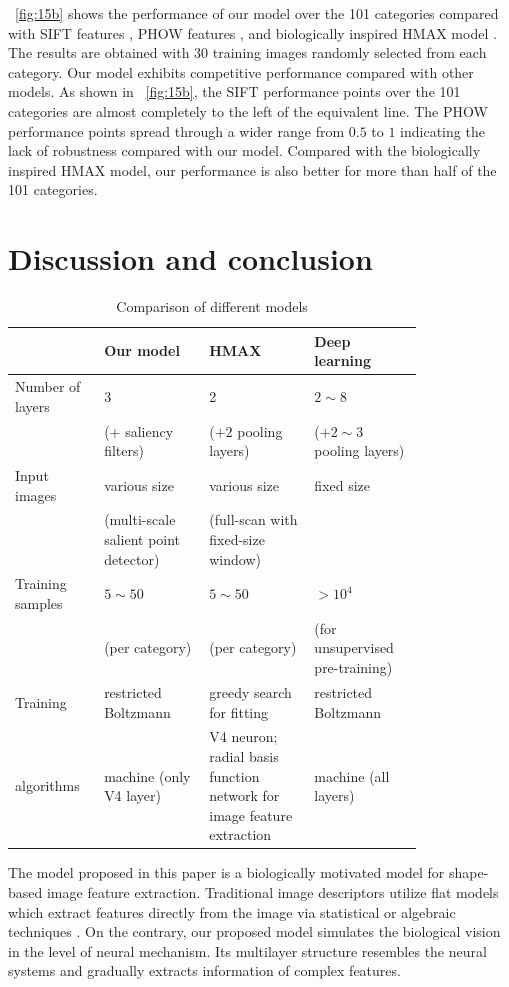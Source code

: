 \documentclass[twocolumn]{article}
\begin{document}
\figurename~\ref{fig:15b} shows the performance of our model over the 101 categories
compared with SIFT features \cite{lowe1999}, PHOW features \cite{lazebnik2006}, and biologically inspired HMAX model \cite{cadieu2007}.
The results are obtained with 30 training images randomly selected from each category.
Our model exhibits competitive performance compared with other models.
As shown in \figurename~\ref{fig:15b}, the SIFT performance points over the 101 categories are almost completely to the left of the equivalent line.
The PHOW performance points spread through a wider range from $0.5$ to $1$ indicating the lack of robustness compared with our model.
Compared with the biologically inspired HMAX model, our performance is also better for more than half of the 101 categories.

\section{Discussion and conclusion}\label{sec:5}

\begin{table}[!t]
\caption{Comparison of different models}
\centering
\small
\begin{tabular}{|p{0.15\linewidth}|p{0.22\linewidth}|p{0.22\linewidth}|p{0.22\linewidth}|}
\hline
& Our model & HMAX & Deep learning \\\hline
Number of layers & 3 & 2 & $2\sim8$ \\
& ($+$ saliency filters) & ($+2$ pooling layers) & ($+2\sim3$ pooling layers)\\\hline
Input images & various size & various size & fixed size \\
& (multi-scale salient point detector) & (full-scan with fixed-size window) & \\\hline
Training samples & $5\sim50$ & $5\sim50$ & $>10^4$ \\
& (per category) & (per category) & (for unsupervised pre-training) \\\hline
Training & restricted Boltzmann & greedy search for fitting & restricted Boltzmann \\
algorithms & machine (only V4 layer) & V4 neuron; radial basis function network for image feature extraction & machine (all layers) \\\hline
\end{tabular}
\label{tab:2}
\end{table}

The model proposed in this paper is a biologically motivated model for shape-based image feature extraction.
Traditional image descriptors utilize flat models which extract features directly from the image via statistical or algebraic techniques \cite{mikolajczyk2005}. 
On the contrary, our proposed model simulates the biological vision in the level of neural mechanism.
Its multilayer structure resembles the neural systems and gradually extracts information of complex features. 
\end{document}
